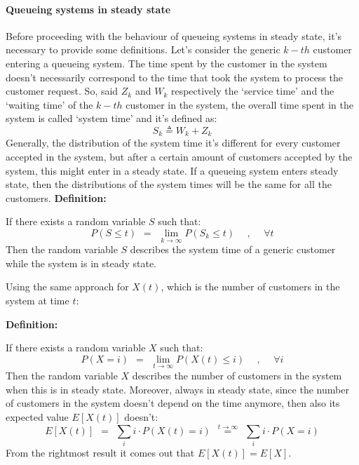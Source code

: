 \documentclass[12pt,a4paper]{article}
\begin{document}
\paragraph{Queueing systems in steady state}
Before proceeding with the behaviour of queueing systems in steady state, it's necessary to provide some definitions. Let's consider the generic $k-th$ customer entering a queueing system. The time spent by the customer in the system doesn't necessarily correspond to the time that took the system to process the customer request. So, said $Z_k$ and $W_k$ respectively the `service time' and the `waiting time' of the $k-th$ customer in the system, the overall time spent in the system is called `system time' and it's defined as:
$$
S_k \triangleq W_k+Z_k
$$ 
Generally, the distribution of the system time it's different for every customer accepted in the system, but after a certain amount of customers accepted by the system, this might enter in a steady state. If a queueing system enters steady state, then the distributions of the system times will be the same for all the customers.
\newpage
\noindent
\textbf{Definition:}

\bigskip\noindent
If there exists a random variable $S$ such that:
$$
P\left( S\leq t\right)
\hspace{5pt}
=
\hspace{5pt}
\lim_{k\rightarrow \infty}
{P\left( S_k\leq t\right)}
\hspace{15pt}
,
\hspace{15pt}
\forall t
$$
Then the random variable $S$ describes the system time of a generic customer while the system is in steady state.

\bigskip\noindent
Using the same approach for $X(t)$, which is the number of customers in the system at time $t$:

\bigskip
\noindent
\textbf{Definition:}

\bigskip\noindent
If there exists a random variable $X$ such that:
$$
P\left( X=i\right)
\hspace{5pt}
=
\hspace{5pt}
\lim_{t\rightarrow \infty}
{P\left( X(t)\leq i\right)}
\hspace{15pt}
,
\hspace{15pt}
\forall i
$$
\noindent
Then the random variable $X$ describes the number of customers in the system when this is in steady state. Moreover, always in steady state, since the number of customers in the system doesn't depend on the time anymore, then also its expected value $E\left[X(t)\right]$ doesn't:
$$
E\left[X(t)\right]
\hspace{5pt}
=
\hspace{5pt}
\sum_{i}
{
i \cdot P\left(X(t)=i\right)
}
\hspace{5pt}
\overset{t\rightarrow \infty}{=}
\hspace{5pt}
\sum_{i}
{
i \cdot P\left(X=i\right)
}
$$
From the rightmost result it comes out that $E\left[X(t)\right]=E\left[X\right]$.
\end{document}
